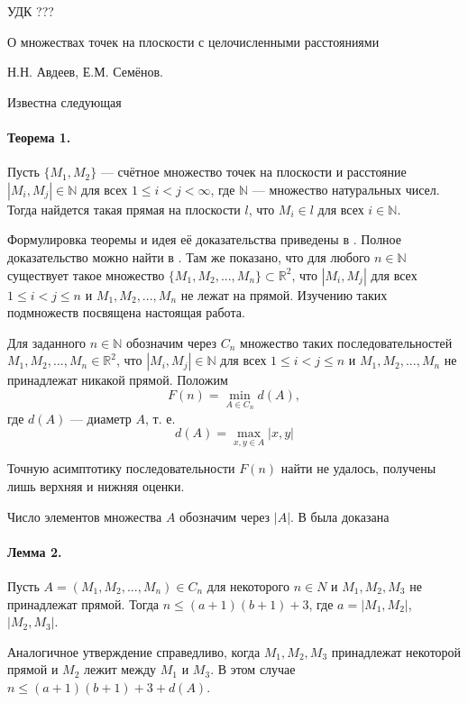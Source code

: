 \documentclass[a4paper,14pt]{article} %
\begin{document}
\large


УДК ???

О множествах точек на плоскости с целочисленными расстояниями

Н.Н. Авдеев, Е.М. Семёнов.


Известна следующая

\paragraph{Теорема 1.} Пусть $\{M_1,M_2\}$ --- счётное множество точек на плоскости и расстояние $|M_i,M_j|\in \mathbb{N}$ для всех $1\leq i < j <\infty$, где $\mathbb{N}$ --- множество натуральных чисел. Тогда найдется такая прямая на плоскости $l$, что $M_i\in l$ для всех $i \in \mathbb{N}$.

Формулировка теоремы и идея её доказательства приведены в \cite{Newman}. Полное доказательство можно найти в \cite{angem1kurs}. Там же показано, что для любого $n\in \mathbb{N}$ существует такое множество $\{M_1,M_2,...,M_n\}\subset \mathbb{R}^2$, что $|M_i,M_j|$ для всех $1\leq i < j  \leq n$ и $M_1, M_2, ..., M_n$ не лежат на прямой. Изучению таких подмножеств посвящена настоящая работа.


Для заданного $n\in \mathbb{N}$ обозначим через $C_n$ множество таких последовательностей $M_1,M_2,...,M_n \in \mathbb{R}^2$, что $|M_i,M_j|\in\mathbb{N}$ для всех $1\leq i < j  \leq n$ и  $M_1,M_2,...,M_n$ не принадлежат никакой прямой. Положим
$$
F(n)=\min\limits_{A\in C_n} d(A),
$$
где $d(A)$ --- диаметр $A$, т. е.
$$
d(A)=\max\limits_{x,y\in A}|x,y|
$$

Точную асимптотику последовательности  $F(n)$ найти не удалось, получены лишь верхняя и нижняя оценки.

Число элементов множества $A$ обозначим через $|A|$.
В \cite{angem1kurs} была доказана

\paragraph{Лемма 2.}

Пусть $A=(M_1, M_2, ..., M_n) \in C_n$ для некоторого $n\in N$ и $M_1, M_2, M_3$ не принадлежат прямой.
Тогда $n\leq (a+1)(b+1)+3$, где $a=|M_1,M_2|$, $|M_2,M_3|$.

Аналогичное утверждение справедливо, когда $M_1,M_2,M_3$ принадлежат некоторой прямой и $M_2$ лежит между $M_1$ и $M_3$.
В этом случае
$n\leq (a+1)(b+1)+3+d(A)$.
\end{document}
